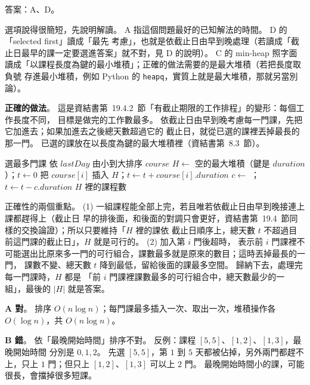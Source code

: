 \begin{pastsoln}
答案：A、D。

選項說得很簡短，先說明解讀。 A 指這個問題最好的已知解法的時間。 D 的「selected first」讀成「最先
考慮」，也就是依截止日由早到晚處理（若讀成「截止日最早的課一定要選進答案」就不對，見 D 的說明）。
C 的 min-heap 照字面讀成「以課程長度為鍵的最小堆積」；正確的做法需要的是最大堆積（若把長度取負號
存進最小堆積，例如 Python 的 \texttt{heapq}，實質上就是最大堆積，那就另當別論）。

\textbf{正確的做法}。 這是資結書第~19.4.2~節「有截止期限的工作排程」的變形：每個工作長度不同，
目標是做完的工作數最多。 依截止日由早到晚考慮每一門課，先把它加進去；如果加進去之後總天數超過它的
截止日，就從已選的課裡丟掉最長的那一門。 已選的課放在以長度為鍵的最大堆積裡（資結書第~8.3~節）。

\begin{pseudo}{選最多門課}
    \State 依 $\mathit{lastDay}$ 由小到大排序 $\mathit{course}$
    \State $H \gets$ 空的最大堆積（鍵是 $\mathit{duration}$）；$t \gets 0$ 
        \State 把 $\mathit{course}[i]$ 插入 $H$；$t \gets t + \mathit{course}[i].\mathit{duration}$
            \State $c \gets$ ；$t \gets t - c.\mathit{duration}$
        \EndIf
    \EndFor
    \State \Return $H$ 裡的課程數
\EndFunction
\end{pseudo}

正確性的兩個重點。 (1) 一組課程能全部上完，若且唯若依截止日由早到晚接連上課都趕得上（截止日
早的排後面，和後面的對調只會更好，資結書第~19.4~節同樣的交換論證）；所以只要維持「$H$ 裡的課依
截止日順序上，總天數 $t$ 不超過目前這門課的截止日」，$H$ 就是可行的。 (2) 加入第 $i$ 門後超時，
表示前 $i$ 門課裡不可能選出比原來多一門的可行組合，課數最多就是原來的數目；這時丟掉最長的一門，
課數不變、總天數 $t$ 降到最低，留給後面的課最多空間。 歸納下去，處理完每一門課時，$H$ 都是
「前 $i$ 門課裡課數最多的可行組合中，總天數最少的一組」，最後的 $|H|$ 就是答案。

\textbf{A 對}。 排序 $O(n \log n)$；每門課最多插入一次、取出一次，堆積操作各 $O(\log n)$，共
$O(n \log n)$。

\textbf{B 錯}。 依「最晚開始時間」排序不對。 反例：課程 $[5, 5]$、$[1, 2]$、$[1, 3]$，最晚開始時間
分別是 $0, 1, 2$。 先選 $[5, 5]$，第 $1$ 到 $5$ 天都被佔掉，另外兩門都趕不上，只上 $1$ 門；但只上
$[1, 2]$、$[1, 3]$ 可以上 $2$ 門。 最晚開始時間小的課，可能很長，會擋掉很多短課。


\end{pastsoln}
